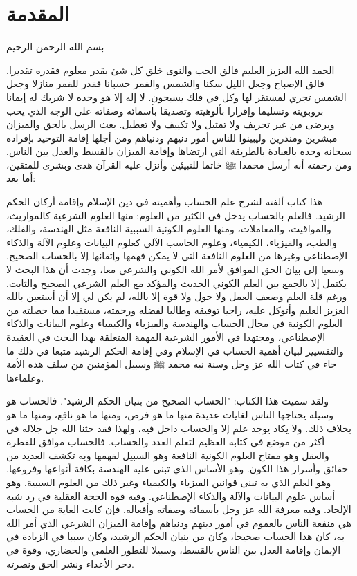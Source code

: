 \chapter*{المقدمة}

\begin{center}
    بسم الله الرحمن الرحيم
\end{center}

الحمد الله العزيز العليم فالق الحب والنوى خلق كل شئ بقدر معلوم فقدره تقديرا. فالق الإصباح وجعل الليل سكنا والشمس والقمر حسبانا فقدر للقمر منازلا وجعل الشمس تجري لمستقر لها وكل في فلك يسبحون. لا إله إلا هو وحده لا شريك له  إيمانا بروبويته وتسليما وإقرارا بألوهيته وتصديقا بأسمائه وصفاته على الوجه الذي يحب ويرضى من غير تحريف ولا تمثيل ولا تكييف ولا تعطيل. بعث الرسل بالحق والميزان مبشرين ومنذرين وليبينوا للناس أمور دنيهم ودنياهم ومن أجلها إقامة التوحيد بإفراده سبحانه وحده بالعبادة بالطريقة التي ارتضاها وإقامة الميزان بالقسط والعدل بين الناس. ومن رحمته أنه أرسل محمدا ﷺ خاتما للنبيئين وأنزل عليه القرآن هدى وبشرى للمتقين، أما بعد:

هذا كتاب ألفته لشرح علم الحساب وأهميته في دين الإسلام وإقامة أركان الحكم الرشيد. فالعلم بالحساب يدخل في الكثير من العلوم: منها العلوم الشرعية كالمواريث، والمواقيت، والمعاملات، ومنها العلوم الكونية السببية النافعة مثل الهندسة، والفلك، والطب، والفيزياء، الكيمياء، وعلوم الحاسب الآلي كعلوم البيانات وعلوم الآلة والذكاء الإصطناعي وغيرها من العلوم النافعة التي لا يمكن فهمها وإتقانها إلا بالحساب الصحيح. وسعيا إلى بيان الحق الموافق لأمر الله الكوني والشرعي معا، وجدت أن هذا البحث لا يكتمل إلا بالجمع بين العلم الكوني الحديث والمؤكد مع العلم الشرعي الصحيح والثابت. ورغم قلة العلم وضعف العمل ولا حول ولا قوة إلا بالله، لم يكن لي إلا أن أستعين بالله العزيز العليم وأتوكل عليه، راجيا توفيقه وطالبا لفضله ورحمته، مستفيدا مما حصلته من العلوم الكونية في مجال الحساب والهندسة والفيزياء والكيمياء وعلوم البيانات والذكاء الإصطناعي، ومجتهدا في الأمور الشرعية المهمة المتعلقة بهذا البحث في العقيدة والتفسيير لبيان أهمية الحساب في الإسلام وفي إقامة الحكم الرشيد متبعا في ذلك ما جاء في كتاب الله عز وجل وسنة نبه محمد ﷺ وسبيل المؤمنين من سلف هذه الأمة وعلماءها.

ولقد سميت هذا الكتاب: "الحساب الصحيح من بنيان الحكم الرشيد". فالحساب هو وسيلة يحتاجها الناس لغايات عديدة منها ما هو فرض، ومنها ما هو نافع، ومنها ما هو بخلاف ذلك. ولا يكاد يوجد علم إلا والحساب داخل فيه، ولهذا فقد حثنا الله جل جلاله في أكثر من موضع في كتابه العظيم لتعلم العدد والحساب. فالحساب موافق للفطرة والعقل وهو مفتاح العلوم الكونية النافعة وهو السبيل لفهمها وبه تكشف العديد من حقائق وأسرار هذا الكون. وهو الأساس الذي تبنى عليه الهندسة بكافة أنواعها وفروعها. وهو العلم الذي به تبنى قوانين الفيزياء والكيمياء وغير ذلك من العلوم السببية. وهو أساس علوم البيانات والآلة والذكاء الإصطناعي. وفيه قوه الحجة العقلية في رد شبه الإلحاد. وفيه معرفة الله عز وجل بأسمائه وصفاته وأفعاله. فإن كانت الغاية من الحساب هي منفعة الناس بالعموم في أمور دينهم ودنياهم وإقامة الميزان الشرعي الذي أمر الله به، كان هذا الحساب صحيحا، وكان من بنيان الحكم الرشيد، وكان سببا في الزيادة في الإيمان وإقامة العدل بين الناس بالقسط، وسبيلا للتطور العلمي والحضاري، وقوة في دحر الأعداء ونشر الحق ونصرته. 

